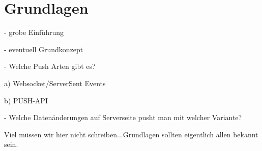 \section{Grundlagen}

- grobe Einführung 

- eventuell Grundkonzept

- Welche Push Arten gibt es?

  a) Websocket/ServerSent Events
  
  b) PUSH-API

- Welche Datenänderungen auf Serverseite pusht man mit welcher Variante?

Viel müssen wir hier nicht schreiben...Grundlagen sollten eigentlich allen bekannt sein.